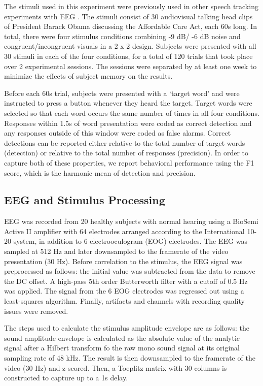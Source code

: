 \documentclass[10pt,letterpaper]{article}
\begin{document}
  The stimuli used in this experiment were previously used in other 
  speech tracking experiments with EEG \cite{Crosse2015,Crosse2016}.
  The stimuli consist of 30 audiovisual talking head clips of President
  Barack Obama discussing the Affordable Care Act, each 60s long. In total, 
  there were four stimulus conditions combining -9 dB/ -6 dB noise and 
  congruent/incongruent visuals in a 2 x 2 design. Subjects were presented
  with all 30 stimuli in each of the four conditions, for a total of 120
  trials that took place over 2 experimental sessions. The sessions were
  separated by at least one week to minimize the effects of subject 
  memory on the results.

  Before each 60s trial, subjects were presented with a `target word' and 
  were instructed to press a button whenever they heard the target. Target 
  words were selected so that each word occurs the same number of times
  in all four conditions. Responses within 1.5s of word presentation 
  were coded as correct detection and any responses outside of this window
  were coded as false alarms. Correct detections can be reported either 
  relative to the total number of target words (detection) or relative 
  to the total number of responses (precision). In order to capture 
  both of these properties, we report behavioral performance using the 
  F1 score, which is the harmonic mean of detection and precision.
  

\subsection{EEG and Stimulus Processing}

  EEG was recorded from 20 healthy subjects with normal hearing
  using a BioSemi Active II amplifier with 64 electrodes 
  arranged according to the International 10-20 system, in addition to 6
  electrooculogram (EOG) electrodes. The EEG was sampled at 512 Hz and 
  later downsampled to the framerate of the video presentation (30 Hz).
  Before correlation to the stimulus, the EEG signal was preprocessed as 
  follows: the initial value was subtracted from the data to remove the 
  DC offset. A high-pass 5th order Butterworth filter with a cutoff of 
  0.5 Hz was applied. The signal from the 6 EOG electrodes was regressed 
  out using a least-squares algorithm. Finally, artifacts and channels 
  with recording quality issues were removed.

  The steps used to calculate the stimulus amplitude envelope are as follows:
  the sound amplitude envelope is calculated as the absolute value of the 
  analytic signal after a Hilbert transform fo the raw mono sound signal 
  at its original sampling rate of 48 kHz. The result is then downsampled
  to the framerate of the video (30 Hz) and z-scored. Then, a Toeplitz matrix
  with 30 columns is constructed to capture up to a 1s delay.
  
\end{document}
